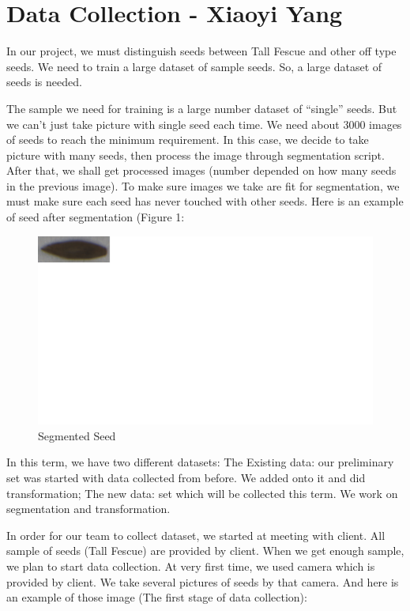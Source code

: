 \documentclass[onecolumn, draftclsnofoot,10pt, compsoc]{IEEEtran}
\begin{document}
\section{Data Collection - Xiaoyi Yang}
In our project, we must distinguish seeds between Tall Fescue and other off type seeds. We need to train a large dataset of sample seeds. So, a large dataset of seeds is needed. 

The sample we need for training is a large number dataset of “single” seeds. But we can’t just take picture with single seed each time. We need about 3000 images of seeds to reach the minimum requirement. In this case, we decide to take picture with many seeds, then process the image through segmentation script. After that, we shall get processed images (number depended on how many seeds in the previous image). To make sure images we take are fit for segmentation, we must make sure each seed has never touched with other seeds.
Here is an example of seed after segmentation (Figure 1:
\begin{figure}
	\includegraphics{seed.png}
	\caption{Segmented Seed}
\end{figure}

In this term, we have two different datasets: The Existing data: our preliminary set was started with data collected from before. We added onto it and did transformation; The new data: set which will be collected this term. We work on segmentation and transformation.

In order for our team to collect dataset, we started at meeting with client. All sample of seeds (Tall Fescue) are provided by client. When we get enough sample, we plan to start data collection. At very first time, we used camera which is provided by client. We take several pictures of seeds by that camera. And here is an example of those image (The first stage of data collection):
\end{document}
